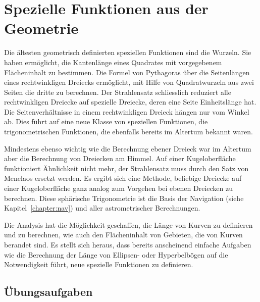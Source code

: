 %
%
%
\chapter{Spezielle Funktionen aus der Geometrie
\label{buch:chapter:geometrie}}
\rhead{}

Die ältesten geometrisch definierten speziellen Funktionen
sind die Wurzeln.
Sie haben ermöglicht, die Kantenlänge eines Quadrates mit vorgegebenem
Flächeninhalt zu bestimmen.
Die Formel von Pythagoras über die Seitenlängen eines rechtwinkligen
Dreiecks ermöglicht, mit Hilfe von Quadratwurzeln aus zwei Seiten
die dritte zu berechnen.
Der Strahlensatz schliesslich reduziert alle rechtwinkligen
Dreiecke auf spezielle Dreiecke, deren eine Seite Einheitslänge 
hat.
Die Seitenverhältnisse in einem rechtwinkligen Dreieck hängen nur 
vom Winkel ab.
Dies führt auf eine neue Klasse von speziellen Funktionen,
die trigonometrischen Funktionen,
die ebenfalls bereits im Altertum bekannt waren.

Mindestens ebenso wichtig wie die Berechnung ebener Dreieck
war im Altertum aber die Berechnung von Dreiecken am Himmel.
Auf einer Kugeloberfläche funktioniert Ähnlichkeit nicht mehr,
der Strahlensatz muss durch den Satz von Menelaos ersetzt werden.
Es ergibt sich eine Methode, beliebige Dreiecke auf einer Kugeloberfläche
ganz analog zum Vorgehen bei ebenen Dreiecken zu berechnen.
Diese sphärische Trigonometrie ist die Basis der Navigation
(siehe Kapitel~\ref{chapter:nav})
und aller astrometrischer Berechnungen.

Die Analysis hat die Möglichkeit geschaffen, die Länge von Kurven
zu definieren und zu berechnen, wie auch den Flächeninhalt von
Gebieten, die von Kurven berandet sind.
Es stellt sich heraus, dass bereits anscheinend einfache Aufgaben
wie die Berechnung der Länge von Ellipsen- oder Hyperbelbögen auf
die Notwendigkeit führt, neue spezielle Funktionen zu definieren.


%




\section*{Übungsaufgaben}
\begin{uebungsaufgaben}
\end{uebungsaufgaben}

